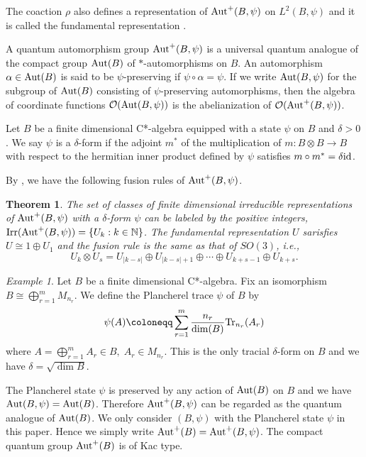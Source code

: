 \documentclass[12pt]{amsart}
\theoremstyle{plain} %
\newtheorem{theorem}[equation]{Theorem}
\theoremstyle{definition}
\theoremstyle{remark}
\newtheorem{example}[equation]{Example}
\begin{document}
The coaction $\rho$ also defines a representation of ${\rm Aut}^+(B, \psi)$ on $L^2(B, \psi)$ \cite[Theorem 1.1]{Ban99} and it is called the fundamental representation .


A quantum automorphism group ${\rm Aut}^+(B, \psi)$ is a universal quantum analogue of the compact group ${\rm Aut}(B)$ of $*$-automorphisms on $B$. An automorphism $\alpha\in{\rm Aut}(B)$ is said to be $\psi$-preserving if $\psi\circ\alpha=\psi$. If we write ${\rm Aut}(B, \psi)$ for the subgroup of ${\rm Aut}(B)$ consisting of $\psi$-preserving automorphisms, then the algebra of coordinate functions $\mathcal{O}({\rm Aut}(B, \psi))$ is the abelianization of $\mathcal{O}({\rm Aut}^+(B, \psi))$.

Let $B$ be a finite dimensional C*-algebra equipped with a state $\psi$ on $B$ and $\delta>0$. We say $\psi$ is a $\delta$-form if the adjoint $m^*$ of the multiplication of $m:B\otimes B\to B$ with respect to the hermitian inner product defined by $\psi$ satisfies $m\circ m^*=\delta {\rm id}$. 

By \cite[Theorem 4.1]{Ban99}, we have the following fusion rules of ${\rm Aut}^+(B, \psi)$.

\begin{theorem}
The set of classes of finite dimensional irreducible representations of ${\rm Aut}^+(B, \psi)$ with a $\delta$-form $\psi$ can be labeled by the positive integers, ${\rm Irr}({\rm Aut}^+(B, \psi))=\{U_k:k\in\mathbb{N}\}$. The fundamental representation $U$ sarisfies $U\cong 1\oplus U_1$ and the fusion rule is the same as that of $SO(3)$, i.e.,
\[U_k\otimes U_s=U_{|k-s|}\oplus U_{|k-s|+1}\oplus\cdots\oplus U_{k+s-1}\oplus U_{k+s}.\]
\end{theorem}

\begin{example}
Let $B$ be a finite dimensional C*-algebra. Fix an isomorphism  $B\cong\bigoplus^m_{r=1} M_{n_r}$. We define the Plancherel trace $\psi$ of $B$ by
\[\psi(A)\coloneqq\sum^m_{r=1}\frac{n_r}{\dim(B)}{\rm Tr}_{n_r}(A_r)\]
where $A=\bigoplus^m_{r=1}A_r\in B,\; A_r\in M_{n_r}$.
This is the only tracial $\delta$-form on $B$ and we have $\delta=\sqrt{\dim B}$.
\end{example}

The Plancherel state $\psi$ is preserved by any action of ${\rm Aut}(B)$ on $B$ and we have ${\rm Aut}(B, \psi)={\rm Aut}(B)$. Therefore ${\rm Aut}^+(B, \psi)$ can be regarded as the quantum analogue of ${\rm Aut}(B)$. 
We only consider $(B, \psi)$ with the Plancherel state $\psi$ in this paper. Hence we simply write ${\rm Aut}^+(B)={\rm Aut}^+(B, \psi)$. The compact quantum group ${\rm Aut}^+(B)$ is of Kac type.
\end{document}
